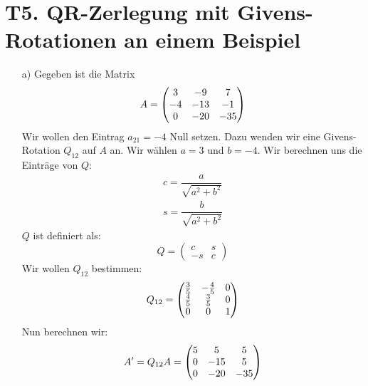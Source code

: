 \documentclass[11pt]{article}
\theoremstyle{plain}
\theoremstyle{definition}
\renewcommand{\a}{\"{a}}
\begin{document}
\section*{T5. QR-Zerlegung mit Givens-Rotationen an einem Beispiel}
\begin{itemize}
\item[a)]
Gegeben ist die Matrix
\begin{equation}
A = 
\begin{pmatrix}3 & -9 & 7\cr -4 & -13 & -1\cr 0 & -20 & -35\end{pmatrix}
\end{equation}
Wir wollen den Eintrag $a_{21} = -4$ Null setzen. Dazu wenden wir eine Givens-Rotation $Q_{12}$ auf $A$ an. Wir w\a hlen $a=3$ und $b=-4$. Wir berechnen uns die Eintr\a ge von $Q$:
\begin{align*}
c = \dfrac{a}{\sqrt{a^2+b^2}} \\
s = \dfrac{b}{\sqrt{a^2+b^2}}
\end{align*}
$Q$ ist definiert als:
\begin{equation}
Q=
\begin{pmatrix}
c & s \\ 
-s & c
\end{pmatrix}
\end{equation}
Wir wollen $Q_{12}$ bestimmen: 
\begin{equation}
Q_{12}=
\begin{pmatrix}\frac{3}{5} & -\frac{4}{5} & 0\cr \frac{4}{5} & \frac{3}{5} & 0\cr 0 & 0 & 1\end{pmatrix}
\end{equation}
Nun berechnen wir:
\begin{equation}
A'=Q_{12}A = 
\begin{pmatrix}5 & 5 & 5\cr 0 & -15 & 5\cr 0 & -20 & -35\end{pmatrix}
\end{equation}


\end{itemize}
\end{document}
